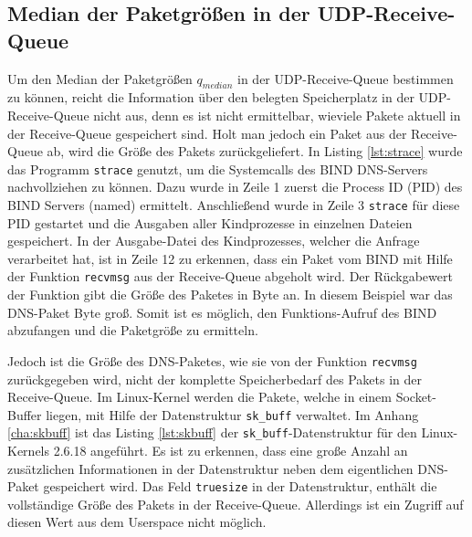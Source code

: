 \documentclass[a4paper, 12pt, BCOR10mm, DIV12, toc=bibliography, toc=listof, german]{scrbook}
\begin{document}

		\subsection*{Median der Paketgrößen in der UDP-Receive-Queue} %


		Um den Median der Paketgrößen $q_{median}$ in der UDP-Receive-Queue bestimmen zu können, reicht
		die Information über den belegten Speicherplatz in der UDP-Receive-Queue nicht aus, denn es ist
		nicht ermittelbar, wieviele Pakete aktuell in der Receive-Queue gespeichert sind. Holt man
		jedoch ein Paket aus der Receive-Queue ab, wird die Größe des Pakets zurückgeliefert. In Listing
		\ref{lst:strace} wurde das Programm \texttt{strace} genutzt, um die Systemcalls des BIND
		DNS-Servers nachvollziehen zu können. Dazu wurde in Zeile 1 zuerst die Process ID (PID) des BIND
		Servers (named) ermittelt. Anschließend wurde in Zeile 3 \texttt{strace} für diese PID gestartet
		und die Ausgaben aller Kindprozesse in einzelnen Dateien gespeichert. In der Ausgabe-Datei des
		Kindprozesses, welcher die Anfrage verarbeitet hat, ist in Zeile 12 zu erkennen, dass ein Paket
		vom BIND mit Hilfe der Funktion \texttt{recvmsg} aus der Receive-Queue abgeholt wird. Der
		Rückgabewert der Funktion gibt die Größe des Paketes in Byte an. In diesem Beispiel war das
		DNS-Paket \unit[45]{Byte} groß. Somit ist es möglich, den Funktions-Aufruf des BIND abzufangen
		und die Paketgröße zu ermitteln.

		

		Jedoch ist die Größe des DNS-Paketes, wie sie von der Funktion \texttt{recvmsg}
		zurückgegeben wird, nicht der komplette Speicherbedarf des Pakets in der Receive-Queue. Im
		Linux-Kernel werden die Pakete, welche in einem Socket-Buffer liegen, mit Hilfe der
		Datenstruktur \texttt{sk\_buff} verwaltet. Im Anhang \ref{cha:skbuff} ist das Listing
		\ref{lst:skbuff} der \texttt{sk\_buff}-Datenstruktur für den Linux-Kernels 2.6.18 angeführt. Es ist
		zu erkennen, dass eine große Anzahl an zusätzlichen Informationen in der Datenstruktur neben
		dem eigentlichen DNS-Paket gespeichert wird. Das Feld \texttt{truesize} in der Datenstruktur,
		enthält die vollständige Größe des Pakets in der Receive-Queue. Allerdings ist ein Zugriff auf
		diesen Wert aus dem Userspace nicht möglich.
\end{document}
